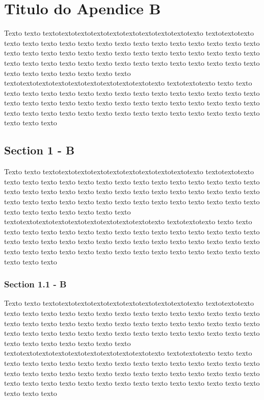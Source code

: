 %

\chapter{Titulo do Apendice B}\label{apen:apendiceB}

Texto texto textotextotextotextotextotextotextotextotextotexto textotextotexto texto texto texto texto texto texto texto texto texto texto texto texto texto texto texto texto texto texto texto texto texto texto texto texto texto texto texto texto texto texto texto texto texto texto texto texto texto texto texto texto texto texto texto texto texto texto texto texto texto textotextotextotextotextotextotextotextotextotexto textotextotexto texto texto texto texto texto texto texto texto texto texto texto texto texto texto texto texto texto texto texto texto texto texto texto texto texto texto texto texto texto texto texto texto texto texto texto texto texto texto texto texto texto texto texto texto texto texto texto 

\section{Section 1 - B}

Texto texto textotextotextotextotextotextotextotextotextotexto textotextotexto texto texto texto texto texto texto texto texto texto texto texto texto texto texto texto texto texto texto texto texto texto texto texto texto texto texto texto texto texto texto texto texto texto texto texto texto texto texto texto texto texto texto texto texto texto texto texto texto texto textotextotextotextotextotextotextotextotextotexto textotextotexto texto texto texto texto texto texto texto texto texto texto texto texto texto texto texto texto texto texto texto texto texto texto texto texto texto texto texto texto texto texto texto texto texto texto texto texto texto texto texto texto texto texto texto texto texto texto texto 

\subsection{Section 1.1 - B}

Texto texto textotextotextotextotextotextotextotextotextotexto textotextotexto texto texto texto texto texto texto texto texto texto texto texto texto texto texto texto texto texto texto texto texto texto texto texto texto texto texto texto texto texto texto texto texto texto texto texto texto texto texto texto texto texto texto texto texto texto texto texto texto texto textotextotextotextotextotextotextotextotextotexto textotextotexto texto texto texto texto texto texto texto texto texto texto texto texto texto texto texto texto texto texto texto texto texto texto texto texto texto texto texto texto texto texto texto texto texto texto texto texto texto texto texto texto texto texto texto texto texto texto texto 
